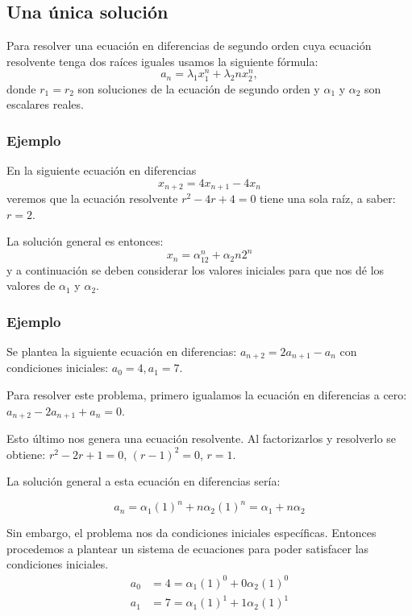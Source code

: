 \documentclass{article}
\begin{document}
\subsection{Una única solución}
\label{sec:unica}

Para resolver una ecuación en diferencias de segundo orden cuya
ecuación resolvente tenga dos raíces iguales usamos la siguiente fórmula:
\begin{equation}
 \label{raicesiguales}
 a_n=\lambda_1x_1^n +\lambda_2nx_2^n,
\end{equation}
donde $r_1=r_2$ son soluciones de la ecuación de segundo orden y
$\alpha_1$ y $\alpha_2$ son escalares reales.

\subsubsection{Ejemplo}

En la siguiente ecuación en diferencias
\begin{equation}
  \label{eq:1}
  x_{n+2}=4x_{n+1}-4x_{n}
\end{equation}
veremos que la ecuación resolvente $r^2-4r+4=0$ tiene una sola raíz, a
saber: $r=2$.

La solución general es entonces:
$$x_n=\alpha_12^n+\alpha_2n2^n$$
y a continuación se deben considerar los valores iniciales para que
nos dé los valores de $\alpha_1$ y $\alpha_2$.

\subsubsection{Ejemplo}

Se plantea la siguiente ecuación en diferencias:
$a_{n+2}=2a_{n+1}-a_{n}$ con condiciones iniciales: $a_{0}=4, a_{1}=7$.

Para resolver este problema, primero igualamos la ecuación en diferencias a
cero: $a_{n+2}-2a_{n+1}+a_{n}=0$.

Esto último nos genera una ecuación resolvente. Al factorizarlos y
resolverlo se obtiene: $r^2-2r+1=0$, $(r-1)^2=0$, ${r=1}$.

La solución general a esta ecuación en diferencias sería:

$$a_{n}=\alpha_{1}(1)^n+n\alpha_{2}(1)^n=\alpha_{1}+n\alpha_{2}$$

Sin embargo, el problema nos da condiciones iniciales
específicas. Entonces procedemos a plantear un sistema de ecuaciones
para poder satisfacer las condiciones iniciales.
\begin{align*}
  a_{0}&=4=\alpha_{1}(1)^0+0\alpha_{2}(1)^0\\
  a_{1}&=7=\alpha_{1}(1)^1+1\alpha_{2}(1)^1
\end{align*}
\end{document}
